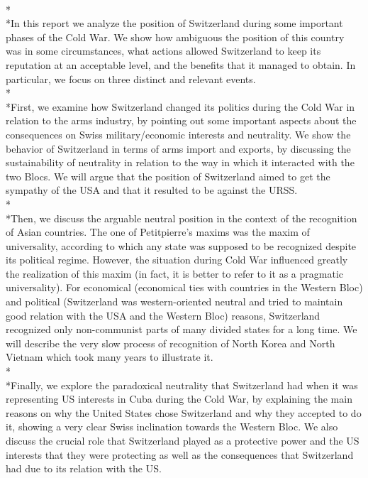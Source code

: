 \documentclass[a4paper]{article}
\begin{document}
\\*\\*In this report we analyze the position of Switzerland during some important phases of the Cold War. We show how ambiguous the position of this country was in some circumstances, what actions allowed Switzerland to keep its reputation at an acceptable level, and the benefits that it managed to obtain. In particular, we focus on three distinct and relevant events.
\\*\\*First, we examine how Switzerland changed its politics during the Cold War in relation to the arms industry, by pointing out some important aspects about the consequences on Swiss military/economic interests and neutrality. We show the behavior of Switzerland in terms of arms import and exports, by discussing the sustainability of neutrality in relation to the way in which it interacted with the two Blocs. We will argue that the position of Switzerland aimed to get the sympathy of the USA and that it resulted to be against the URSS.
\\*\\*Then, we discuss the arguable neutral position in the context of the recognition of Asian countries. The one of Petitpierre's maxims was the maxim of universality, according to which any state was supposed to be recognized despite its political regime. However, the situation during Cold War influenced greatly the realization of this maxim (in fact, it is better to refer to it as a pragmatic universality). For economical (economical ties with countries in the Western Bloc) and political (Switzerland was western-oriented neutral and tried to maintain good relation with the USA and the Western Bloc) reasons, Switzerland recognized only non-communist parts of many divided states for a long time. We will describe the very slow process of recognition of North Korea and North Vietnam which took many years to illustrate it.
\\*\\*Finally, we explore the paradoxical neutrality that Switzerland had when it was representing US interests in Cuba during the Cold War, by explaining the main reasons on why the United States chose Switzerland and why they accepted to do it, showing a very clear Swiss inclination towards the Western Bloc. We also discuss the crucial role that Switzerland played as a protective power and the US interests that they were protecting as well as the consequences that Switzerland had due to its relation with the US.
\clearpage
\end{document}
